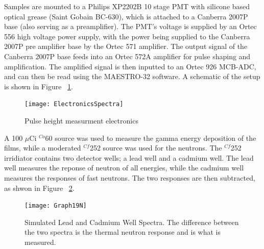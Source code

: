 \documentclass{anstrans}
\newcommand{\iso}[2]{${}^{#2}${#1}}
\begin{document}
Samples are mounted to a Philips XP2202B 10 stage PMT with silicone based optical grease (Saint Gobain BC-630), which is attached to a Canberra 2007P base (also serving as a preamplifier).   
The PMT’s voltage is supplied by an Ortec 556 high voltage power supply, with the power being supplied to the Canberra 2007P pre amplifier base by the Ortec 571 amplifier.  
The output signal of the Canberra 2007P base feeds into an Ortec 572A amplifier for pulse shaping and amplification. 
The amplified signal is then inputted to an Ortec 926 MCB-ADC, and can then be read using the MAESTRO-32 software. 
A schematic of the setup is shown in Figure ~\ref{fig:ElectronicsSpectra}.
\begin{figure}
	\centering
	\texttt{[image: ElectronicsSpectra]}
	\caption{Pulse height measurment electronics}
	\label{fig:ElectronicsSpectra}
\end{figure}
A 100 $\mu$Ci \iso{60}{Co} source was used to measure the gamma energy deposition of the films, while a moderated \iso{252}{Cf} source was used for the neutrons.
The \iso{252}{Cf} irridiator contains two detector wells; a lead well and a cadmium well.
The lead well measures the reponse of neutron of all energies, while the cadmium well measures the responses of fast neutrons.
The two responses are then subtracted, as shwon in Figure ~\ref{fig:SimPbCdSpectra}.
	\begin{figure}
		\centering
		\texttt{[image: Graph19N]}
		\caption{Simulated Lead and Cadmium Well Spectra. The difference between the two spectra is the thermal neutron response and is what is measured.}
		\label{fig:SimPbCdSpectra}
	\end{figure}
\end{document}
